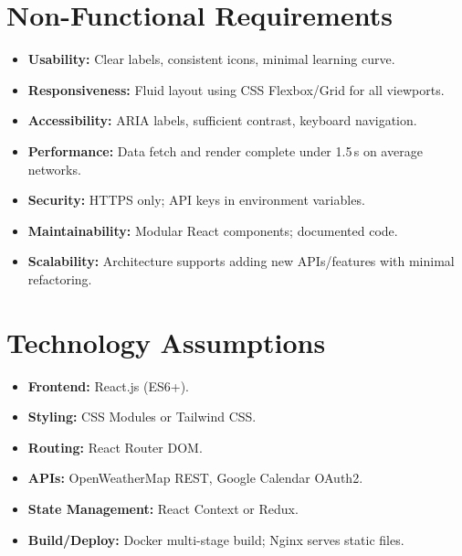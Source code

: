 \documentclass[fontsize=13pt,a4paper]{scrartcl}
\begin{document}
\newpage

\section{Non-Functional Requirements}
\begin{itemize}[nosep]
  \item \textbf{Usability:} Clear labels, consistent icons, minimal learning curve.
  \item \textbf{Responsiveness:} Fluid layout using CSS Flexbox/Grid for all viewports.
  \item \textbf{Accessibility:} ARIA labels, sufficient contrast, keyboard navigation.
  \item \textbf{Performance:} Data fetch and render complete under 1.5\,s on average networks.
  \item \textbf{Security:} HTTPS only; API keys in environment variables.
  \item \textbf{Maintainability:} Modular React components; documented code.
  \item \textbf{Scalability:} Architecture supports adding new APIs/features with minimal refactoring.
\end{itemize}



\section{Technology Assumptions}
\begin{itemize}[nosep]
  \item \textbf{Frontend:} React.js (ES6+).
  \item \textbf{Styling:} CSS Modules or Tailwind CSS.
  \item \textbf{Routing:} React Router DOM.
  \item \textbf{APIs:} OpenWeatherMap REST, Google Calendar OAuth2.
  \item \textbf{State Management:} React Context or Redux.
  \item \textbf{Build/Deploy:} Docker multi-stage build; Nginx serves static files.
\end{itemize}


\newpage
\end{document}
